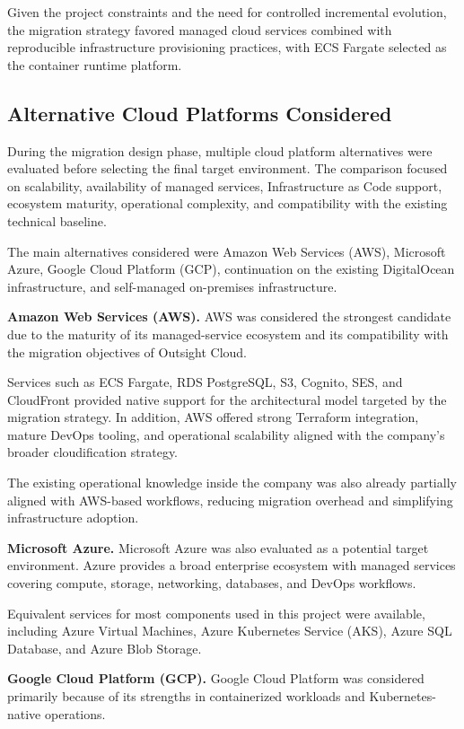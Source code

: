 Given the project constraints and the need for controlled incremental evolution, the migration strategy favored managed cloud services combined with reproducible infrastructure provisioning practices, with ECS Fargate selected as the container runtime platform.

\subsection{Alternative Cloud Platforms Considered}
During the migration design phase, multiple cloud platform alternatives were evaluated before selecting the final target environment. The comparison focused on scalability, availability of managed services, Infrastructure as Code support, ecosystem maturity, operational complexity, and compatibility with the existing technical baseline.

The main alternatives considered were Amazon Web Services (AWS), Microsoft Azure, Google Cloud Platform (GCP), continuation on the existing DigitalOcean infrastructure, and self-managed on-premises infrastructure.

\textbf{Amazon Web Services (AWS).} AWS was considered the strongest candidate due to the maturity of its managed-service ecosystem and its compatibility with the migration objectives of Outsight Cloud.

Services such as ECS Fargate, RDS PostgreSQL, S3, Cognito, SES, and CloudFront provided native support for the architectural model targeted by the migration strategy. In addition, AWS offered strong Terraform integration, mature DevOps tooling, and operational scalability aligned with the company's broader cloudification strategy.

The existing operational knowledge inside the company was also already partially aligned with AWS-based workflows, reducing migration overhead and simplifying infrastructure adoption.

\textbf{Microsoft Azure.} Microsoft Azure was also evaluated as a potential target environment. Azure provides a broad enterprise ecosystem with managed services covering compute, storage, networking, databases, and DevOps workflows.

Equivalent services for most components used in this project were available, including Azure Virtual Machines, Azure Kubernetes Service (AKS), Azure SQL Database, and Azure Blob Storage.

\textbf{Google Cloud Platform (GCP).} Google Cloud Platform was considered primarily because of its strengths in containerized workloads and Kubernetes-native operations.

